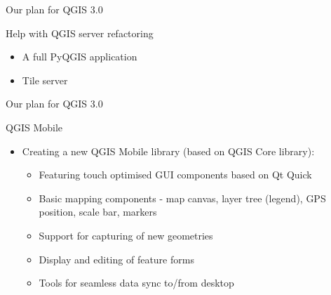 \begin{frame}{Our plan for QGIS 3.0}
	\begin{block}{Help with QGIS server refactoring}
		\begin{itemize}
			\item A full PyQGIS application
			\item Tile server
		\end{itemize}
	\end{block}
\end{frame}

\begin{frame}{Our plan for QGIS 3.0}
	\begin{block}{QGIS Mobile}
		\begin{itemize}
			\item Creating a new QGIS Mobile library (based on QGIS Core library):
			\begin{itemize}
			\item Featuring touch optimised GUI components based on Qt Quick
			\item Basic mapping components - map canvas, layer tree (legend), GPS position, scale bar, markers
			\item Support for capturing of new geometries
			\item Display and editing of feature forms
			\item Tools for seamless data sync to/from desktop
		\end{itemize}
		\end{itemize}
	\end{block}
\end{frame}